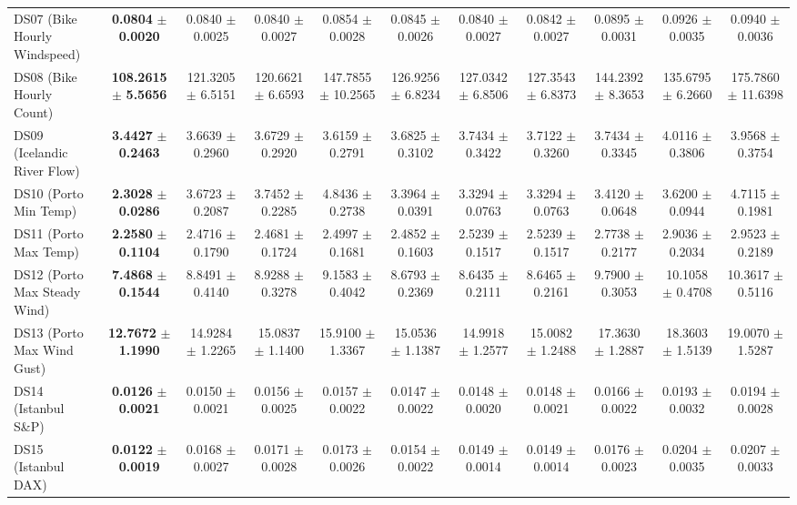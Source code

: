 \begin{table}[t]
{{\begin{tabular}{lcccccccccc}
DS07 (Bike Hourly Windspeed) & \textbf{0.0804} $\pm$ \textbf{0.0020} & 0.0840 $\pm$ 0.0025 & 0.0840 $\pm$ 0.0027 & 0.0854 $\pm$ 0.0028 & 0.0845 $\pm$ 0.0026 & 0.0840 $\pm$ 0.0027 & 0.0842 $\pm$ 0.0027 & 0.0895 $\pm$ 0.0031 & 0.0926 $\pm$ 0.0035 & 0.0940 $\pm$ 0.0036 \\
DS08 (Bike Hourly Count) & \textbf{108.2615} $\pm$ \textbf{5.5656} & 121.3205 $\pm$ 6.5151 & 120.6621 $\pm$ 6.6593 & 147.7855 $\pm$ 10.2565 & 126.9256 $\pm$ 6.8234 & 127.0342 $\pm$ 6.8506 & 127.3543 $\pm$ 6.8373 & 144.2392 $\pm$ 8.3653 & 135.6795 $\pm$ 6.2660 & 175.7860 $\pm$ 11.6398 \\
DS09 (Icelandic River Flow) & \textbf{3.4427} $\pm$ \textbf{0.2463} & 3.6639 $\pm$ 0.2960 & 3.6729 $\pm$ 0.2920 & 3.6159 $\pm$ 0.2791 & 3.6825 $\pm$ 0.3102 & 3.7434 $\pm$ 0.3422 & 3.7122 $\pm$ 0.3260 & 3.7434 $\pm$ 0.3345 & 4.0116 $\pm$ 0.3806 & 3.9568 $\pm$ 0.3754 \\
DS10 (Porto Min Temp) & \textbf{2.3028} $\pm$ \textbf{0.0286} & 3.6723 $\pm$ 0.2087 & 3.7452 $\pm$ 0.2285 & 4.8436 $\pm$ 0.2738 & 3.3964 $\pm$ 0.0391 & 3.3294 $\pm$ 0.0763 & 3.3294 $\pm$ 0.0763 & 3.4120 $\pm$ 0.0648 & 3.6200 $\pm$ 0.0944 & 4.7115 $\pm$ 0.1981 \\
DS11 (Porto Max Temp) & \textbf{2.2580} $\pm$ \textbf{0.1104} & 2.4716 $\pm$ 0.1790 & 2.4681 $\pm$ 0.1724 & 2.4997 $\pm$ 0.1681 & 2.4852 $\pm$ 0.1603 & 2.5239 $\pm$ 0.1517 & 2.5239 $\pm$ 0.1517 & 2.7738 $\pm$ 0.2177 & 2.9036 $\pm$ 0.2034 & 2.9523 $\pm$ 0.2189 \\
DS12 (Porto Max Steady Wind) & \textbf{7.4868} $\pm$ \textbf{0.1544} & 8.8491 $\pm$ 0.4140 & 8.9288 $\pm$ 0.3278 & 9.1583 $\pm$ 0.4042 & 8.6793 $\pm$ 0.2369 & 8.6435 $\pm$ 0.2111 & 8.6465 $\pm$ 0.2161 & 9.7900 $\pm$ 0.3053 & 10.1058 $\pm$ 0.4708 & 10.3617 $\pm$ 0.5116 \\
DS13 (Porto Max Wind Gust) & \textbf{12.7672} $\pm$ \textbf{1.1990} & 14.9284 $\pm$ 1.2265 & 15.0837 $\pm$ 1.1400 & 15.9100 $\pm$ 1.3367 & 15.0536 $\pm$ 1.1387 & 14.9918 $\pm$ 1.2577 & 15.0082 $\pm$ 1.2488 & 17.3630 $\pm$ 1.2887 & 18.3603 $\pm$ 1.5139 & 19.0070 $\pm$ 1.5287 \\
DS14 (Istanbul S\&P) & \textbf{0.0126} $\pm$ \textbf{0.0021} & 0.0150 $\pm$ 0.0021 & 0.0156 $\pm$ 0.0025 & 0.0157 $\pm$ 0.0022 & 0.0147 $\pm$ 0.0022 & 0.0148 $\pm$ 0.0020 & 0.0148 $\pm$ 0.0021 & 0.0166 $\pm$ 0.0022 & 0.0193 $\pm$ 0.0032 & 0.0194 $\pm$ 0.0028 \\
DS15 (Istanbul DAX) & \textbf{0.0122} $\pm$ \textbf{0.0019} & 0.0168 $\pm$ 0.0027 & 0.0171 $\pm$ 0.0028 & 0.0173 $\pm$ 0.0026 & 0.0154 $\pm$ 0.0022 & 0.0149 $\pm$ 0.0014 & 0.0149 $\pm$ 0.0014 & 0.0176 $\pm$ 0.0023 & 0.0204 $\pm$ 0.0035 & 0.0207 $\pm$ 0.0033 \\

\end{tabular}}}
\end{table}
